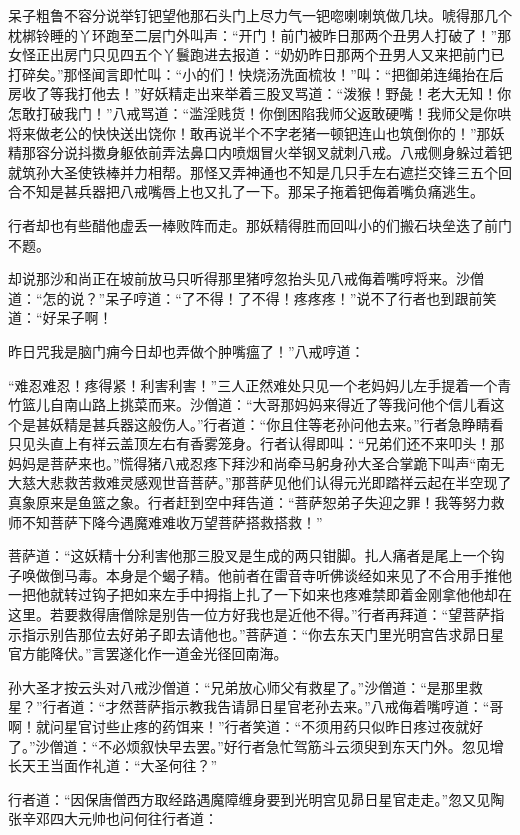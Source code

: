 \documentclass[12pt,UTF8]{ctexbook}
\begin{document}
呆子粗鲁不容分说举钉钯望他那石头门上尽力气一钯唿喇喇筑做几块。唬得那几个枕梆铃睡的丫环跑至二层门外叫声：“开门！前门被昨日那两个丑男人打破了！”那女怪正出房门只见四五个丫鬟跑进去报道：“奶奶昨日那两个丑男人又来把前门已打碎矣。”那怪闻言即忙叫：“小的们！快烧汤洗面梳妆！”叫：“把御弟连绳抬在后房收了等我打他去！”好妖精走出来举着三股叉骂道：“泼猴！野彘！老大无知！你怎敢打破我门！”八戒骂道：“滥淫贱货！你倒困陷我师父返敢硬嘴！我师父是你哄将来做老公的快快送出饶你！敢再说半个不字老猪一顿钯连山也筑倒你的！”那妖精那容分说抖擞身躯依前弄法鼻口内喷烟冒火举钢叉就刺八戒。八戒侧身躲过着钯就筑孙大圣使铁棒并力相帮。那怪又弄神通也不知是几只手左右遮拦交锋三五个回合不知是甚兵器把八戒嘴唇上也又扎了一下。那呆子拖着钯侮着嘴负痛逃生。

行者却也有些醋他虚丢一棒败阵而走。那妖精得胜而回叫小的们搬石块垒迭了前门不题。

却说那沙和尚正在坡前放马只听得那里猪哼忽抬头见八戒侮着嘴哼将来。沙僧道：“怎的说？”呆子哼道：“了不得！了不得！疼疼疼！”说不了行者也到跟前笑道：“好呆子啊！

昨日咒我是脑门痈今日却也弄做个肿嘴瘟了！”八戒哼道：

“难忍难忍！疼得紧！利害利害！”三人正然难处只见一个老妈妈儿左手提着一个青竹篮儿自南山路上挑菜而来。沙僧道：“大哥那妈妈来得近了等我问他个信儿看这个是甚妖精是甚兵器这般伤人。”行者道：“你且住等老孙问他去来。”行者急睁睛看只见头直上有祥云盖顶左右有香雾笼身。行者认得即叫：“兄弟们还不来叩头！那妈妈是菩萨来也。”慌得猪八戒忍疼下拜沙和尚牵马躬身孙大圣合掌跪下叫声“南无大慈大悲救苦救难灵感观世音菩萨。”那菩萨见他们认得元光即踏祥云起在半空现了真象原来是鱼篮之象。行者赶到空中拜告道：“菩萨恕弟子失迎之罪！我等努力救师不知菩萨下降今遇魔难难收万望菩萨搭救搭救！”

菩萨道：“这妖精十分利害他那三股叉是生成的两只钳脚。扎人痛者是尾上一个钩子唤做倒马毒。本身是个蝎子精。他前者在雷音寺听佛谈经如来见了不合用手推他一把他就转过钩子把如来左手中拇指上扎了一下如来也疼难禁即着金刚拿他他却在这里。若要救得唐僧除是别告一位方好我也是近他不得。”行者再拜道：“望菩萨指示指示别告那位去好弟子即去请他也。”菩萨道：“你去东天门里光明宫告求昴日星官方能降伏。”言罢遂化作一道金光径回南海。

孙大圣才按云头对八戒沙僧道：“兄弟放心师父有救星了。”沙僧道：“是那里救星？”行者道：“才然菩萨指示教我告请昴日星官老孙去来。”八戒侮着嘴哼道：“哥啊！就问星官讨些止疼的药饵来！”行者笑道：“不须用药只似昨日疼过夜就好了。”沙僧道：“不必烦叙快早去罢。”好行者急忙驾筋斗云须臾到东天门外。忽见增长天王当面作礼道：“大圣何往？”

行者道：“因保唐僧西方取经路遇魔障缠身要到光明宫见昴日星官走走。”忽又见陶张辛邓四大元帅也问何往行者道：
\end{document}
